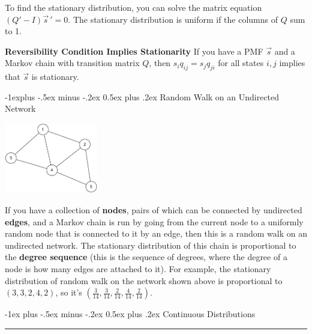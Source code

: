 \documentclass[10pt,landscape]{article}
\makeatletter
\renewcommand{\section}{\@startsection{section}{1}{0mm}%
{-1ex plus -.5ex minus -.2ex}%
{0.5ex plus .2ex}%
{\normalfont\large\bfseries}}
\renewcommand{\subsection}{\@startsection{subsection}{2}{0mm}%
{-1explus -.5ex minus -.2ex}%
{0.5ex plus .2ex}%
{\normalfont\normalsize\bfseries}}
\makeatother
\begin{document}
\begin{multicols*}{3}
        \smallskip

        To find the stationary distribution, you can solve the matrix equation $(Q' - I){\vec{s}\,}'= 0$. The stationary distribution is uniform if the columns of $Q$ sum to 1.

        \smallskip

        \textbf{Reversibility Condition Implies Stationarity}  If you have a PMF $\vec{s}$ and a Markov chain with transition matrix $Q$, then $s_iq_{ij} = s_jq_{ji}$ for all states $i, j$ implies that $\vec{s}$ is stationary.

        \subsection{Random Walk on an Undirected Network}
        \begin{minipage}{\linewidth}
            \centering
            \includegraphics[width=1.6in]{figures/network1.pdf}
        \end{minipage}
        \medskip

        If you have a collection of \textbf{nodes}, pairs of which can be connected by undirected \textbf{edges}, and a Markov chain is run by going from the current node to a uniformly random node that is connected to it by an edge, then this is a random walk on an undirected network. The stationary distribution of this chain is proportional to the \textbf{degree sequence} (this is the sequence of degrees, where the degree of a node is how many edges are attached to it). For example, the stationary distribution of random walk on the network shown above is proportional to $(3,3,2,4,2)$, so it's $(\frac{3}{14}, \frac{3}{14}, \frac{2}{14}, \frac{4}{14}, \frac{2}{14})$.


        \section{Continuous Distributions}\smallskip \hrule height 2pt \smallskip


\end{multicols*}
\end{document}
